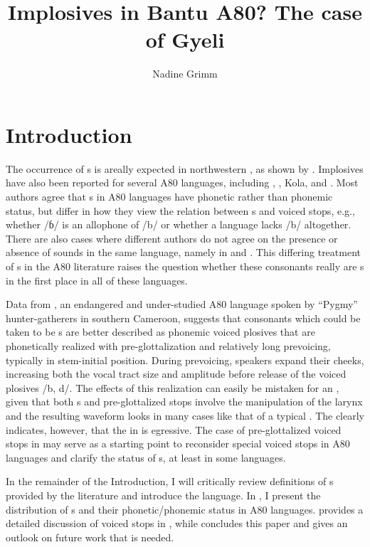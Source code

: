 \documentclass[output=paper]{LSP/langsci}
\author{Nadine Grimm\affiliation{University of Rochester}  
}
\title{Implosives in {B}antu {A}80? {T}he case of {G}yeli}
\begin{document}
\section{Introduction} 
\label{sec:grimm:1}

 The occurrence of s is areally expected in northwestern , as shown by \citet[58]{Clements2008}. Implosives have also been reported for several  A80 languages, including , , Kola, and . Most authors agree that s in A80 languages have phonetic rather than phonemic status, but differ in how they view the relation between s and voiced stops, e.g., whether /ɓ/ is an allophone of /b/ or whether a language lacks /b/ altogether. There are also cases where different authors do not agree on the presence or absence of  sounds in the same language, namely in  and . This differing treatment of s in the A80 literature raises the question whether these consonants really are s in the first place in all of these languages.

Data from , an endangered and under-studied  A80 language spoken by ``Pygmy'' hunter-gatherers in southern Cameroon, suggests that consonants which could be taken to be s are better described as phonemic voiced plosives that are phonetically realized with pre-glottalization and relatively long prevoicing, typically in stem-initial position. During prevoicing, speakers expand their cheeks, increasing both the vocal tract size and amplitude before release of the voiced plosives /b, d/.   The effects of this realization can easily be mistaken for an , given that both s and pre-glottalized stops involve the manipulation of the larynx and the resulting waveform looks in many cases like that of a typical . The  clearly indicates, however, that the  in  is egressive. The case of pre-glottalized voiced stops in  may serve as a starting point to reconsider special voiced stops in A80 languages and clarify the status of s, at least in some languages.

In the remainder of the Introduction, I will critically review definitions of s provided by the literature and introduce the  language. In , I present the distribution of s and their phonetic/phonemic status in  A80 languages.  provides a detailed discussion of voiced stops in , while  concludes this paper and gives an outlook on future work that is needed.
\end{document}
